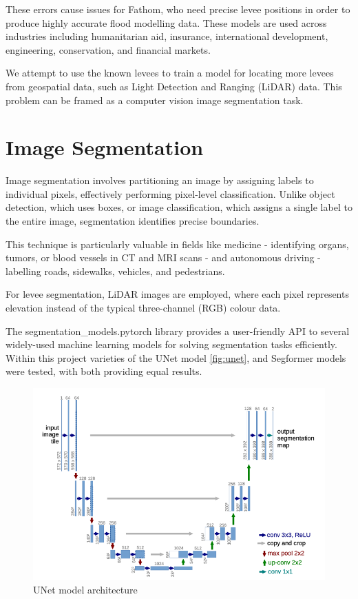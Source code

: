 \documentclass[NOTE, disdraft=true, UKenglish]{\DISCDTLATEXPATH UCLCDTDISdoc}
\begin{document}
These errors cause issues for Fathom, who need precise levee positions in order to produce highly accurate flood modelling data. These models are used across industries including humanitarian aid, insurance, international development, engineering, conservation, and financial markets.

We attempt to use the known levees to train a model for locating more levees from geospatial data, such as Light Detection and Ranging (LiDAR) data. This problem can be framed as a computer vision image segmentation task.

\section{Image Segmentation}
\label{sec:method}
%

Image segmentation involves partitioning an image by assigning labels to individual pixels, effectively performing pixel-level classification. Unlike object detection, which uses boxes, or image classification, which assigns a single label to the entire image, segmentation identifies precise boundaries.

This technique is particularly valuable in fields like medicine - identifying organs, tumors, or blood vessels in CT and MRI scans - and autonomous driving - labelling roads, sidewalks, vehicles, and pedestrians.

For levee segmentation, LiDAR images are employed, where each pixel represents elevation instead of the typical three-channel (RGB) colour data.

The segmentation\_models.pytorch library provides a user-friendly API to several widely-used machine learning models for solving segmentation tasks efficiently. Within this project varieties of the UNet model \autoref{fig:unet}, and Segformer models were tested, with both providing equal results.

\begin{figure}[!h]
    \centering
    \includegraphics[width=0.75\linewidth]{figures/unet.png}
    \caption{UNet model architecture}
    \label{fig:unet}
\end{figure}
\end{document}
